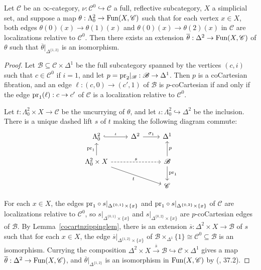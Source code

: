 \documentclass{tac}
\newcommand{\s}[1]{\mathscr{#1}}
\newcommand{\ol}[1]{\overline{#1}}
\newcommand{\tx}[1]{\textnormal{#1}}
\begin{document}
\begin{proposition}\label{localizationzippingprop} Let $\s{C}$ be an $\infty$-category, $\nu : \s{C}^0 \hookrightarrow \s{C}$ a full, reflective subcategory, $X$ a simplicial set, and suppose a map $\theta : \Lambda^2_0 \to \tx{Fun}(X,\s{C})$ such that for each vertex $x\in X$, both edges $\theta (0)(x) \to \theta (1)(x)$ and $\theta (0)(x) \to \theta (2)(x)$ in $\s{C}$ are localizations relative to $\s{C}^0$.  Then there exists an extension $\ol{\theta} : \Delta^2 \to \tx{Fun}(X,\s{C})$ of $\theta$ such that $\ol{\theta}|_{\Delta^{\{1,2 \}}}$ is an isomorphism.
\end{proposition}
\begin{proof} Let $\s{B}\subseteq \s{C} \times \Delta^1$ be the full subcategory spanned by the vertices $(c,i)$ such that $c\in \s{C}^0$ if $i=1$, and let $p= \tx{pr}_2 |_{\s{B}} : \s{B} \to \Delta^1$.  Then $p$ is a coCartesian fibration, and an edge $\ell : (c,0) \to (c',1)$ of $\s{B}$ is $p$-coCartesian if and only if the edge $\tx{pr}_1 (\ell ) : c\to c'$ of $\s{C}$ is a localization relative to $\s{C}^0$.

Let $t:\Lambda^2_0 \times X \to \s{C}$ be the uncurrying of $\theta$, and let $\iota : \Lambda^2_0 \hookrightarrow \Delta^2$ be the inclusion.  There is a unique dashed lift $s$ of $t$ making the following diagram commute:
\[\begin{tikzcd}
\Lambda^2_0  \arrow[hook]{r}{\iota} & \Delta^2 \arrow[]{r}{\sigma_1} & \Delta^1  \\
\Lambda^2_0 \times X \arrow[]{drr}[swap]{t} \arrow[dashed]{rr}{s} \arrow[]{u}{\tx{pr}_1}& & \s{B} \arrow[]{d}{\tx{pr}_1} \arrow[]{u}[swap]{p} \\
 & & \s{C} 
\end{tikzcd}\]

For each $x\in X$, the edges $\tx{pr}_1 \circ s|_{\Delta^{\{0,1 \}} \times \{x \}}$ and $\tx{pr}_1 \circ s|_{\Delta^{\{0,2 \}} \times \{x \}}$ of $\s{C}$ are localizations relative to $\s{C}^0$, so $  s|_{\Delta^{\{0,1 \}} \times \{x \}} $ and $ s|_{\Delta^{\{0,2 \}} \times \{x \}}$ are $p$-coCartesian edges of $\s{B}$. By Lemma~\ref{cocartnzippinglem}, there is an extension $\ol{s} : \Delta^2 \times X \to \s{B}$ of $s$ such that for each $x\in X$, the edge $\ol{s} |_{\Delta^{\{1,2 \}}  \times \{x \}}$ of $\s{B} \times_{\Delta^1} \{ 1 \}\cong \s{C}^0 \subseteq \s{B}$ is an isomorphism.  Currying the composition $\Delta^2 \times X \xrightarrow{\ol{s}} \s{B} \hookrightarrow \s{C} \times \Delta^1$ gives a map $\ol{\theta} : \Delta^2 \to \tx{Fun}(X,\s{C})$, and $\ol{\theta} |_{\Delta^{\{1,2 \}}}$ is an isomorphism in $\tx{Fun}(X, \s{C})$ by (\cite{rezk}, 37.2).
\end{proof}
\end{document}
